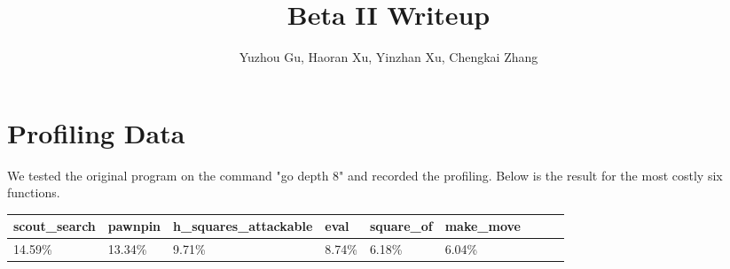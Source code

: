 \documentclass[10pt,twosidep]{article}
\begin{document}
\pagestyle{fancy}

\setlength{\parindent}{2em}
\setlength{\footskip}{30pt}
\setlength{\baselineskip}{1.3\baselineskip}

\title{Beta II Writeup}
\author{Yuzhou Gu, Haoran Xu, Yinzhan Xu, Chengkai Zhang}
\maketitle{}

\section{Profiling Data}
We tested the original program on the command "go depth 8" and recorded the profiling. Below is the result for the most costly six functions.

\begin{tabular}{ |l|l|l|l|l|l|l|l|l| }
\hline
scout\_search & pawnpin & h\_squares\_attackable & eval & square\_of & make\_move\\
\hline
14.59\% & 13.34\% & 9.71\% & 8.74\% & 6.18\% & 6.04\%\\
\hline
\end{tabular}
\end{document}
